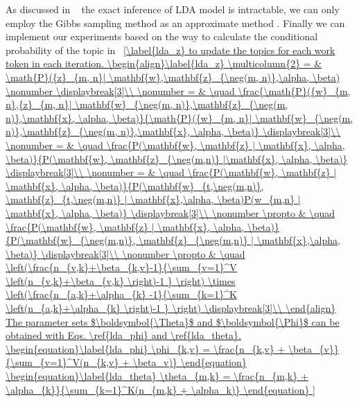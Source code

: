 As discussed in ~\cite{newman2007distributed} the exact inference of LDA model is intractable, we can only employ the Gibbs sampling method as an approximate method \cite{griffiths2002gibbs}. Finally we can implement our experiments based on the way to calculate the conditional probability of the topic in ~\ref{\label{lda_z} to update the topics for each work token in each iteration. 

\begin{align}\label{lda_z}
\multicolumn{2} =   &  \math{P}({z}_{m, n}| \mathbf{w},\mathbf{z}_{\neg(m, n)},\alpha, \beta)  \nonumber
\displaybreak[3]\\ \nonumber
= & \quad \frac{\math{P}({w}_{m, n},{z}_{m, n}| \mathbf{w}_{\neg(m, n)},\mathbf{z}_{\neg(m, n)},\mathbf{x}, \alpha, \beta)}{\math{P}({w}_{m, n}| \mathbf{w}_{\neg(m, n)},\mathbf{z}_{\neg(m, n)},\mathbf{x}, \alpha, \beta)}
\displaybreak[3]\\ \nonumber
= & \quad \frac{P(\mathbf{w}, \mathbf{z} | \mathbf{x}, \alpha, \beta)}{P(\mathbf{w}, \mathbf{z}_{\neg(m,n)} |\mathbf{x}, \alpha, \beta)} \displaybreak[3]\\ \nonumber
= & \quad \frac{P(\mathbf{w}, \mathbf{z} | \mathbf{x}, \alpha, \beta)}{P(\mathbf{w}_{t,\neg(m,n)}, \mathbf{z}_{t,\neg(m,n)} | \mathbf{x},\alpha, \beta)P(w_{m,n} | \mathbf{x}, \alpha, \beta)} \displaybreak[3]\\ \nonumber
\propto & \quad \frac{P(\mathbf{w}, \mathbf{z} | \mathbf{x}, \alpha, \beta)}{P(\mathbf{w}_{\neg(m,n)}, \mathbf{z}_{\neg(m,n)} | \mathbf{x},\alpha, \beta)} \displaybreak[3]\\ \nonumber 
\propto & \quad  \left(\frac{n_{v,k}+\beta_{k,v}-1}{\sum_{v=1}^V \left(n_{v,k}+\beta_{v,k} \right)-1 } \right) \times   \left(\frac{n_{a,k}+\alpha_{k} -1}{\sum_{k=1}^K \left(n_{a,k}+\alpha_{k} \right)-1 } \right)
\displaybreak[3]\\
\end{align}

The parameter sets $\boldsymbol{\Theta}$ and $\boldsymbol{\Phi}$ can be obtained with Eqs. \ref{lda_phi} and \ref{lda_theta}.

\begin{equation}\label{lda_phi}
\phi_{k,v} = \frac{n_{k,v} + \beta_{v}}{\sum_{v=1}^V(n_{k,v} + \beta_v)}
\end{equation}

\begin{equation}\label{lda_theta}
\theta_{m,k} = \frac{n_{m,k} + \alpha_{k}}{\sum_{k=1}^K(n_{m,k} + \alpha_k)}
\end{equation}

}
